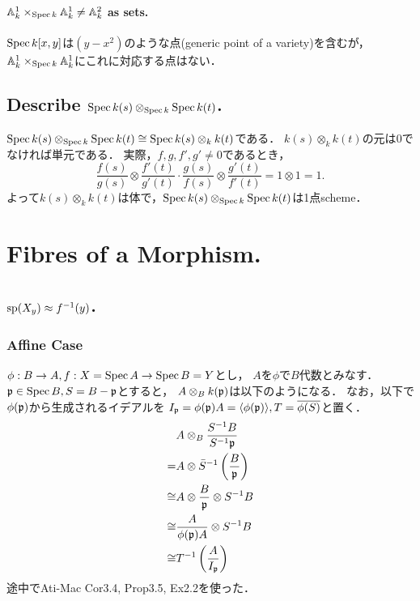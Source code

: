 \documentclass[a4paper]{jsarticle}
\begin{document}
    \paragraph{$\mathbb{A}^1_k \times_{\operatorname{Spec} k} \mathbb{A}^1_k \neq \mathbb{A}^2_k$ as sets.}
    $\operatorname{Spec} k[x,y]$は$(y-x^2)$のような点(generic point of a variety)を含むが，
    $\mathbb{A}^1_k \times_{\operatorname{Spec} k} \mathbb{A}^1_k$にこれに対応する点はない．

    \subsection{Describe $\operatorname{Spec} k(s) \otimes_{\operatorname{Spec} k} \operatorname{Spec} k(t)$.}
    $\operatorname{Spec} k(s) \otimes_{\operatorname{Spec} k} \operatorname{Spec} k(t) \cong \operatorname{Spec} k(s) \otimes_k k(t)$である．
    $k(s) \otimes_k k(t)$の元は$0$でなければ単元である．
    実際，$f,g,f',g' \neq 0$であるとき，
    \[ \frac{f(s)}{g(s)} \otimes \frac{f'(t)}{g'(t)} \cdot \frac{g(s)}{f(s)} \otimes \frac{g'(t)}{f'(t)}=1 \otimes 1=1. \]
    よって$k(s) \otimes_k k(t)$は体で，$\operatorname{Spec} k(s) \otimes_{\operatorname{Spec} k} \operatorname{Spec} k(t)$は1点scheme．

\section{Fibres of a Morphism.} %
\subsection{$\operatorname{sp}(X_y) \approx f^{-1}(y)$.}
    \subsubsection{Affine Case}
    $\phi: B \to A, f: X=\operatorname{Spec} A \to \operatorname{Spec} B=Y$とし，
    $A$を$\phi$で$B$代数とみなす．
    $\mathfrak{p} \in \operatorname{Spec} B, S=B-\mathfrak{p}$とすると，
    $A \otimes_B k(\mathfrak{p})$は以下のようになる．
    なお，以下で$\phi(\mathfrak{p})$から生成されるイデアルを
    $I_{\mathfrak{p}}=\phi(\mathfrak{p})A=\langle \phi(\mathfrak{p}) \rangle, T=\overline{\phi(S)}$と置く．
    \begin{align*}
        {}& A \otimes_B \frac{S^{-1}B}{S^{-1}\mathfrak{p}} \\
        =& A \otimes \bar{S}^{-1}\left( \frac{B}{\mathfrak{p}} \right) \\
        \cong& A \otimes \frac{B}{\mathfrak{p}} \otimes S^{-1}B \\
        \cong& \frac{A}{\phi(\mathfrak{p})A} \otimes S^{-1}B \\
        \cong& T^{-1}\left( \frac{A}{I_{\mathfrak{p}}} \right)
    \end{align*}
    途中でAti-Mac Cor3.4, Prop3.5, Ex2.2を使った．
\end{document}
